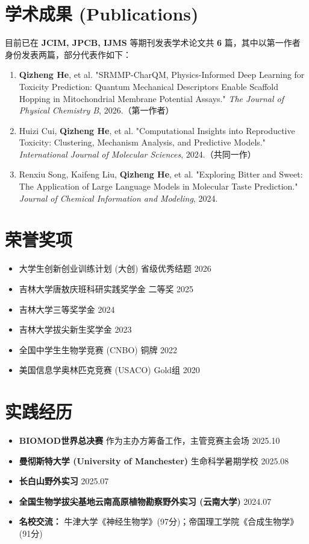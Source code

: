 \documentclass[11pt,a4paper]{article}
\begin{document}
\section{学术成果 (Publications)}
目前已在 \textbf{JCIM, JPCB, IJMS} 等期刊发表学术论文共 \textbf{6} 篇，其中以第一作者身份发表两篇，部分代表作如下：
\begin{enumerate}
    \item \textbf{Qizheng He}, et al. "SRMMP-CharQM, Physics-Informed Deep Learning for Toxicity Prediction: Quantum Mechanical Descriptors Enable Scaffold Hopping in Mitochondrial Membrane Potential Assays." \textit{The Journal of Physical Chemistry B}, 2026.（第一作者）
    \item Huizi Cui, \textbf{Qizheng He}, et al. "Computational Insights into Reproductive Toxicity: Clustering, Mechanism Analysis, and Predictive Models." \textit{International Journal of Molecular Sciences}, 2024.（共同一作）
    \item Renxiu Song, Kaifeng Liu, \textbf{Qizheng He}, et al. "Exploring Bitter and Sweet: The Application of Large Language Models in Molecular Taste Prediction." \textit{Journal of Chemical Information and Modeling}, 2024.
\end{enumerate}

\section{荣誉奖项}
\begin{itemize}[noitemsep, topsep=2pt]
    \item {大学生创新创业训练计划 (大创) 省级优秀结题} \hfill 2026
    \item 吉林大学唐敖庆班科研实践奖学金 二等奖 \hfill 2025
    \item 吉林大学三等奖学金 \hfill 2024
    \item 吉林大学拔尖新生奖学金 \hfill 2023
    \item 全国中学生生物学竞赛 (CNBO) 铜牌 \hfill 2022
    \item 美国信息学奥林匹克竞赛 (USACO) Gold组 \hfill 2020
\end{itemize}

\section{实践经历}
\begin{itemize}[noitemsep, topsep=2pt]
    \item \textbf{BIOMOD世界总决赛}  作为主办方筹备工作，主管竞赛主会场 \hfill 2025.10
    \item \textbf{曼彻斯特大学 (University of Manchester)} 生命科学暑期学校 \hfill 2025.08
    \item \textbf{长白山野外实习} \hfill 2025.07
    \item \textbf{全国生物学拔尖基地云南高原植物勘察野外实习 (云南大学)} \hfill 2024.07
    \item \textbf{名校交流：} 牛津大学《神经生物学》(97分)；帝国理工学院《合成生物学》(91分)
\end{itemize}
\end{document}
